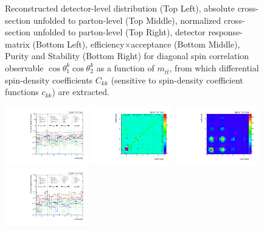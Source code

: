 \begin{refsection}
\begin{figure}[htb]
\begin{center}
\caption{Reconstructed detector-level distribution (Top Left), absolute cross-section unfolded to parton-level (Top Middle), normalized cross-section unfolded to parton-level (Top Right), detector response-matrix (Bottom Left), efficiency$\times$acceptance (Bottom Middle), Purity and Stability (Bottom Right) for diagonal spin correlation observable $\cos\theta_{1}^{k}\cos\theta_{2}^{k}$ as a function of $m_{t\bar{t}}$, from which differential spin-density coefficients $C_{kk}$ (sensitive to spin-density coefficient functions $c_{k k}$) are extracted.}
\label{fig:c_kk_mttbar}
\end{center}
\end{figure}
\clearpage
\begin{figure}[htb]
\begin{center}
 \includegraphics[width=0.32\textwidth]{fig_fullRun2UL/unfolding/combined/deltaSystCombinedlog_rebinnedB_c_kk_mttbar.pdf}
 \includegraphics[width=0.32\textwidth]{fig_fullRun2UL/unfolding/combined/StatCovMatrix_rebinnedB_c_kk_mttbar.pdf}
 \includegraphics[width=0.32\textwidth]{fig_fullRun2UL/unfolding/combined/TotalSystCovMatrix_rebinnedB_c_kk_mttbar.pdf} \\
 \includegraphics[width=0.32\textwidth]{fig_fullRun2UL/unfolding/combined/deltaSystCombinedlogNorm_rebinnedB_c_kk_mttbar.pdf}

\end{center}
\end{figure}
\end{refsection}
